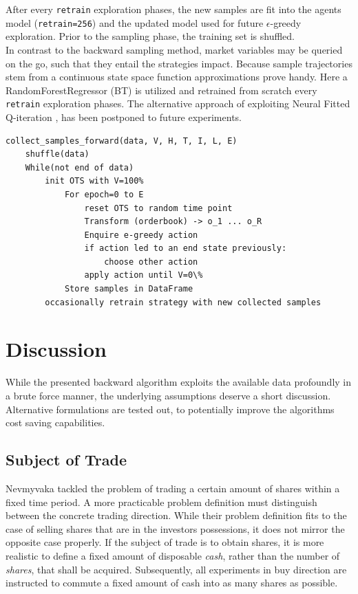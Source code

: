After every \lstinline!retrain! exploration phases, the new samples are fit into the agents model (\eg \lstinline!retrain=256!) and the updated model used for future $\epsilon$-greedy exploration. Prior to the sampling phase, the training set is shuffled.\\

In contrast to the backward sampling method, market variables may be queried on the go, such that they entail the strategies impact. Because sample trajectories stem from a continuous state space function approximations prove handy. Here a RandomForestRegressor (\ie \ac{BT}) is utilized and retrained from scratch every \lstinline!retrain! exploration phases. The alternative approach of exploiting Neural Fitted Q-iteration \Cite{Riedmiller:2005:NFQ}, has been  postponed to future experiments.\\

\begin{lstlisting}[frame=single, breaklines=true, basicstyle=\scriptsize, caption=Forward sampling approach., label=lst:forward:pseudocode]
collect_samples_forward(data, V, H, T, I, L, E)
    shuffle(data)
    While(not end of data)
        init OTS with V=100%
            For epoch=0 to E
                reset OTS to random time point
                Transform (orderbook) -> o_1 ... o_R
                Enquire e-greedy action
                if action led to an end state previously:
                    choose other action
                apply action until V=0\%
    	    Store samples in DataFrame
        occasionally retrain strategy with new collected samples
\end{lstlisting}






\section{Discussion}
\label{chap:backwardalgorithm:discussion}
While the presented backward algorithm exploits the available data profoundly in a brute force manner, the underlying assumptions deserve a short discussion. Alternative formulations are tested out, to potentially improve the algorithms cost saving capabilities.

\subsection{Subject of Trade}
\label{chap:backwardalgorithm:discussion:subjectTrade}
Nevmyvaka \etal \cite{Nevmyvaka:2006} tackled the problem of trading a certain amount of shares within a fixed time period. A more practicable problem definition must distinguish between the concrete trading direction. While their problem definition fits to the case of selling shares that are in the investors possessions, it does not mirror the opposite case properly. If the subject of trade is to obtain shares, it is more realistic to define a fixed amount of disposable \emph{cash}, rather than the number of \emph{shares}, that shall be acquired. Subsequently, all experiments in buy direction are instructed to commute a fixed amount of cash into as many shares as possible.\\
 
